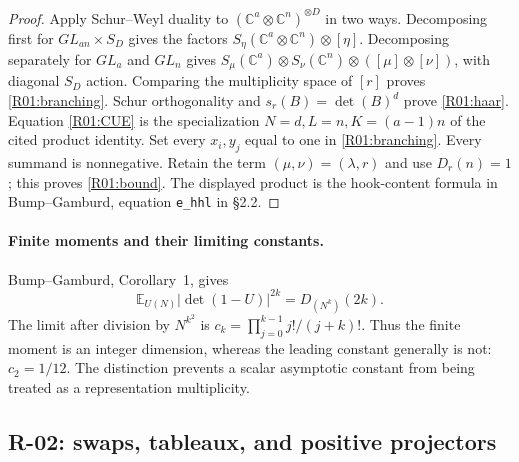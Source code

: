 \documentclass[11pt,a4paper]{article}
\theoremstyle{definition}\newtheorem{definition}{Definition}
\begin{document}
\begin{proof}
Apply Schur--Weyl duality to $(\mathbb C^a\otimes\mathbb C^n)^{\otimes D}$
in two ways. Decomposing first for $GL_{an}\times S_D$ gives the factors
$S_\eta(\mathbb C^a\otimes\mathbb C^n)\otimes[\eta]$.
Decomposing separately for $GL_a$ and $GL_n$ gives
$S_\mu(\mathbb C^a)\otimes S_\nu(\mathbb C^n)\otimes
([\mu]\otimes[\nu])$, with diagonal $S_D$ action. Comparing the multiplicity
space of $[r]$ proves \eqref{R01:branching}. Schur orthogonality and
$s_r(B)=\det(B)^d$ prove \eqref{R01:haar}. Equation \eqref{R01:CUE} is the
specialization $N=d,L=n,K=(a-1)n$ of the cited product identity.
Set every $x_i,y_j$ equal to one in \eqref{R01:branching}. Every summand is
nonnegative. Retain the term $(\mu,\nu)=(\lambda,r)$ and use
$D_r(n)=1$; this proves \eqref{R01:bound}. The displayed product is the
hook-content formula in Bump--Gamburd, equation \nolinkurl{e_hhl} in \S2.2.
\end{proof}

\paragraph{Finite moments and their limiting constants.}
Bump--Gamburd, Corollary~1, gives
\[
 \mathbb E_{U(N)}|\det(1-U)|^{2k}=D_{(N^k)}(2k).
\]
The limit after division by $N^{k^2}$ is
$c_k=\prod_{j=0}^{k-1}j!/(j+k)!$. Thus the finite moment is an integer
dimension, whereas the leading constant generally is not: $c_2=1/12$.
The distinction prevents a scalar asymptotic constant from being treated as
a representation multiplicity.

\subsection{R-02: swaps, tableaux, and positive projectors}
\end{document}
